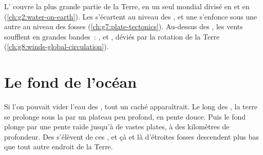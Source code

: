 \begin{recall}
L' couvre la plus grande partie de la Terre, en un seul 
mondial divisé en  et en  (\cref{ch:g2:water-on-earth}). Les
 s'écartent au niveau des , et une 
s'enfonce sous une autre au niveau des fosses
(\cref{ch:g7:plate-tectonics}). Au-dessus des , les vents soufflent
en grandes bandes~: ,  et , déviés
par la rotation de la Terre (\cref{ch:g8:winds-global-circulation}).
\end{recall}

\section{Le fond de l'océan}

Si l'on pouvait vider l'eau des , tout un  caché
apparaîtrait. Le long des , la terre se prolonge sous la  par un
plateau peu profond, en pente douce. Puis le fond plonge par une pente
raide jusqu'à de vastes  plates, à des kilomètres de profondeur. Des
 s'élèvent de ces , et çà et là d'étroites
fosses descendent plus bas que tout autre endroit de la Terre.

